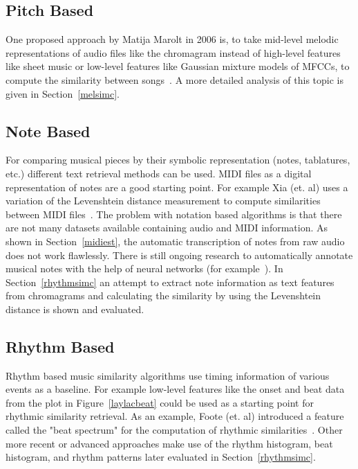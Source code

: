 \subsection{Pitch Based}

One proposed approach by Matija Marolt in 2006 is, to take mid-level melodic representations of audio files like the chromagram instead of high-level features like sheet music or low-level features like Gaussian mixture models of MFCCs, to compute the similarity between songs~\cite{pitch1}. A more detailed analysis of this topic is given in Section~\ref{melsimc}.

\subsection{Note Based}

For comparing musical pieces by their symbolic representation (notes, tablatures, etc.) different text retrieval methods can be used. MIDI files as a digital representation of notes are a good starting point. For example Xia (et. al) uses a variation of the Levenshtein distance measurement to compute similarities between MIDI files~\cite{chroma4}. 
The problem with notation based algorithms is that there are not many datasets available containing audio and MIDI information. As shown in Section~\ref{midiest}, the automatic transcription of notes from raw audio does not work flawlessly. There is still ongoing research to automatically annotate musical notes with the help of neural networks (for example~\cite{crepe1}).
In Section~\ref{rhythmsimc} an attempt to extract note information as text features from chromagrams and calculating the similarity by using the Levenshtein distance is shown and evaluated.

\subsection{Rhythm Based}

Rhythm based music similarity algorithms use timing information of various events as a baseline. For example low-level features like the onset and beat data from the plot in Figure~\ref{laylacbeat} could be used as a starting point for rhythmic similarity retrieval. As an example, Foote (et. al) introduced a feature called the "beat spectrum" for the computation of rhythmic similarities~\cite{rhythm1}. Other more recent or advanced approaches make use of the rhythm histogram, beat histogram, and rhythm patterns later evaluated in Section~\ref{rhythmsimc}.

